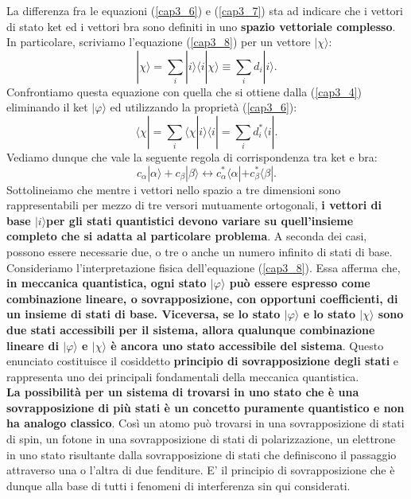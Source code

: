 La differenza fra le equazioni (\ref{cap3_6}) e (\ref{cap3_7}) sta ad indicare che i vettori di stato ket ed i vettori bra sono definiti in uno \textbf{spazio vettoriale complesso}. In particolare, scriviamo l'equazione (\ref{cap3_8}) per un vettore $| \chi\rangle$:
	\begin{equation}
		| \chi \rangle = \sum \limits_{i} | i \rangle \langle i | \chi \rangle \equiv \sum \limits_{i} d_i | i \rangle .
	\end{equation}
Confrontiamo questa equazione con quella che si ottiene dalla (\ref{cap3_4}) eliminando il ket $| \varphi \rangle$ ed utilizzando la proprietà (\ref{cap3_6}):
	\begin{equation}
		\langle \chi | =\sum \limits_{i} \langle \chi | i \rangle \langle i | = \sum \limits_{i} d^*_i \langle i | .
	\end{equation}
Vediamo dunque che vale la seguente regola di corrispondenza tra ket e bra:
	\begin{equation}
		\boxed{
			c_{\alpha}| \alpha \rangle +c_{\beta} | \beta \rangle  \leftrightarrow c^*_{\alpha}\langle \alpha | +c^*_{\beta}\langle \beta | .
			}
	\end{equation}
Sottolineiamo che mentre i vettori nello spazio a tre dimensioni sono rappresentabili per mezzo di tre versori mutuamente ortogonali, \textbf{i vettori di base $| i \rangle $per gli stati quantistici devono variare su quell'insieme completo che si adatta al particolare problema}. A seconda dei casi, possono essere necessarie due, o tre o anche un numero infinito di stati di base.\\

Consideriamo l'interpretazione fisica dell'equazione (\ref{cap3_8}). Essa afferma che, \textbf{in meccanica quantistica, ogni stato $| \varphi \rangle$ può essere espresso come combinazione lineare, o sovrapposizione, con opportuni coefficienti, di un insieme di stati di base. Viceversa, se lo stato $| \varphi \rangle$ e lo stato $| \chi \rangle$ sono due stati accessibili per il sistema, allora qualunque combinazione lineare di $| \varphi \rangle$ e $| \chi \rangle$ è ancora uno stato accessibile del sistema}. Questo enunciato costituisce il cosiddetto \textbf{principio di sovrapposizione degli stati} e rappresenta uno dei principali fondamentali della meccanica quantistica.\\

\textbf{La possibilità per un sistema di trovarsi in uno stato che è una sovrapposizione di più stati è un concetto puramente quantistico e non ha analogo classico}. Così un atomo può trovarsi in una sovrapposizione di stati di spin, un fotone in una sovrapposizione di stati di polarizzazione, un elettrone in uno stato risultante dalla sovrapposizione di stati che definiscono il passaggio attraverso una o l'altra di due fenditure. E' il principio di sovrapposizione che è dunque alla base di tutti i fenomeni di interferenza sin qui considerati.\\

